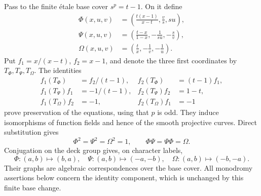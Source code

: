 \documentclass[11pt]{article}
\theoremstyle{remark}
\begin{document}
Pass to the finite \'etale base cover \(s^p=t-1\).  On it define
\begin{align}
 \Phi(x,u,v)&=\left(\frac{t(x-1)}{x-t},\frac v s,su\right),\label{eq:phi}\\
 \Psi(x,u,v)&=\left(\frac{t-x}{1-x},-\frac1{su},-\frac s v\right),\label{eq:psi}\\
 \Omega(x,u,v)&=\left(\frac t x,-\frac1v,-\frac1u\right).\label{eq:omega}
\end{align}
Put \(f_1=x/(x-t)\), \(f_2=x-1\), and denote the three first coordinates
by \(T_\Phi,T_\Psi,T_\Omega\).  The identities
\begin{align*}
 f_1(T_\Phi)&=f_2/(t-1),& f_2(T_\Phi)&=(t-1)f_1,\\
 f_1(T_\Psi)f_1&=-1/(t-1),& f_2(T_\Psi)f_2&=1-t,\\
 f_1(T_\Omega)f_2&=-1,& f_2(T_\Omega)f_1&=-1
\end{align*}
prove preservation of the equations, using that \(p\) is odd.
They induce isomorphisms of function fields and hence of the smooth
projective curves.  Direct substitution gives
\[
 \Phi^2=\Psi^2=\Omega^2=1,\qquad \Phi\Psi=\Psi\Phi=\Omega.
\]
Conjugation on the deck group gives, on character labels,
\begin{equation}\label{eq:actions}
 \Phi:(a,b)\mapsto(b,a),\quad
 \Psi:(a,b)\mapsto(-a,-b),\quad
 \Omega:(a,b)\mapsto(-b,-a).
\end{equation}
Their graphs are algebraic correspondences over the base cover.
All monodromy assertions below concern the identity component, which is
unchanged by this finite base change.
\end{document}
